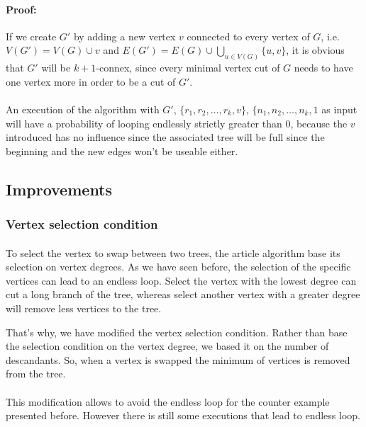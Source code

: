 \paragraph{Proof:}
If we create $G'$ by adding a new vertex $v$ connected to every vertex of $G$,
i.e. $V(G') = V(G) \cup v$ and
$E(G') = E(G) \cup \bigcup \limits_{u \in V(G)} \{u,v\}$, it is obvious that
$G'$ will be $k+1$-connex, since every minimal vertex cut of $G$ needs to have
 one vertex more in order to be a cut of $G'$.

\paragraph{}
An execution of the algorithm with $G'$, $\{r_1,r_2, \dots, r_k, v\}$,
$\{n_1,n_2, \dots, n_k, 1$ as input will have a probability of looping
endlessly strictly greater than $0$, because the $v$ introduced has no influence
since the associated tree will be full since the beginning and the new edges
won't be useable either.
\subsection{Improvements}
\subsubsection{Vertex selection condition}
\paragraph{}
To select the vertex to swap between two trees, the article algorithm base its 
selection on vertex degrees. As we have seen before, the selection of the specific
vertices can lead to an endless loop. Select the vertex with the lowest degree
can cut a long branch of the tree, whereas select another vertex with a greater
degree will remove less vertices to the tree.

That's why, we have modified the vertex selection condition. Rather than base the 
selection condition on the vertex degree, we based it on the number of 
descandants. So, when a vertex is swapped the minimum of vertices is removed
from the tree.

\paragraph{}
This modification allows to avoid the endless loop for the counter example
presented before. However there is still some executions that lead to 
endless loop. 

